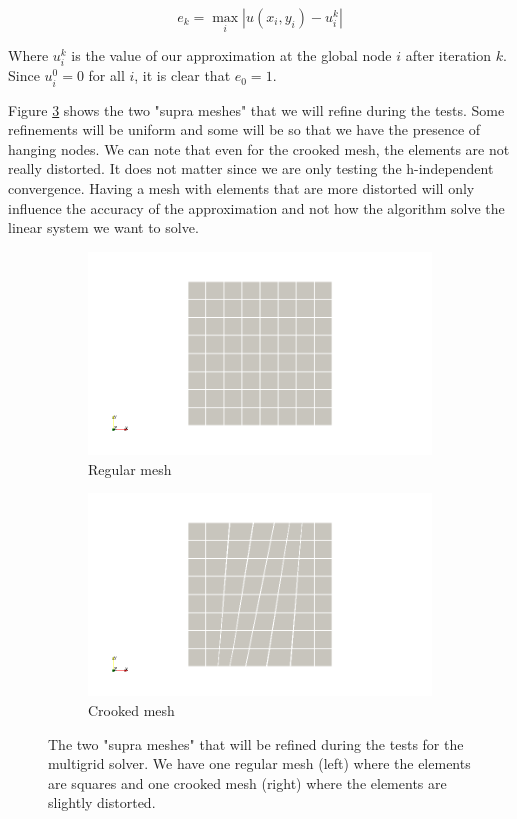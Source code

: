 $$e_k = \max_i |u(x_i,y_i) - u_i^k|$$

Where $u_i^k$ is the value of our approximation at the global node $i$ after iteration $k$. Since $u_i^0 = 0$ for all $i$, it is clear that $e_0 = 1$.

Figure \ref{multi_mesh} shows the two "supra meshes" that we will refine during the tests. Some refinements will be uniform and some will be so that we have the presence of hanging nodes. We can note that even for the crooked mesh, the elements are not really distorted. It does not matter since we are only testing the h-independent convergence. Having a mesh with elements that are more distorted will only influence the accuracy of the approximation and not how the algorithm solve the linear system we want to solve. 

\begin{figure}
\centering
\begin{subfigure}{.5\textwidth}
  \centering
  \includegraphics[width=1.2\linewidth]{Results/multi_mesh_1.png}
  \caption{Regular mesh}
  \label{multi_mesh_1}
\end{subfigure}%
\begin{subfigure}{.5\textwidth}
  \centering
  \includegraphics[width=1.2\linewidth]{Results/multi_mesh_2.png}
  \caption{Crooked mesh}
  \label{multi_mesh_2}
\end{subfigure}
\caption{The two "supra meshes" that will be refined during the tests for the multigrid solver. We have one regular mesh (left) where the elements are squares and one crooked mesh (right) where the elements are slightly distorted.}
\label{multi_mesh}
\end{figure}



